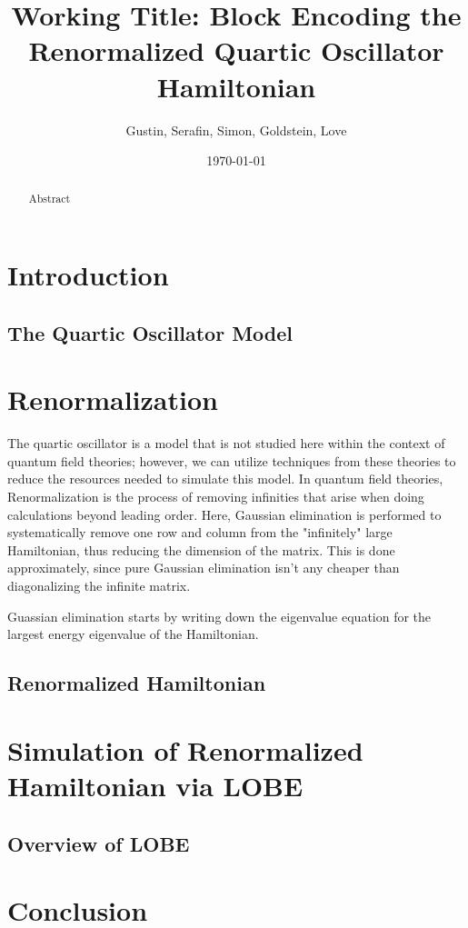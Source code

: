 \documentclass[%
 reprint,
nofootinbib,
 amsmath,amssymb,
 aps,
]{revtex4-2}
\numberwithin{equation}{section}
\begin{document}

\title{Working Title: Block Encoding the Renormalized Quartic Oscillator Hamiltonian}%

\author{Gustin, Serafin, Simon, Goldstein, Love}%

%



\date{\today}%

\begin{abstract}
Abstract
\end{abstract}

\maketitle

\section{Introduction}
\subsection{The Quartic Oscillator Model} 

\section{Renormalization}
The quartic oscillator is a model that is not studied here within the context
of quantum field theories; however, we can utilize techniques from these 
theories to reduce the resources needed to simulate this model. 
In quantum field theories, Renormalization is the process of removing infinities
that arise when doing calculations beyond leading order. Here, Gaussian elimination 
is performed to systematically remove one row and column from the "infinitely"
large Hamiltonian, thus reducing the dimension of the matrix. This is done
approximately, since pure Gaussian elimination isn't any cheaper than 
diagonalizing the infinite matrix. 

Guassian elimination starts by writing down the eigenvalue equation for the 
largest energy eigenvalue of the Hamiltonian. 
\subsection{Renormalized Hamiltonian}

\section{Simulation of Renormalized Hamiltonian via LOBE}
\subsection{Overview of LOBE}

\section{Conclusion}
\end{document}
